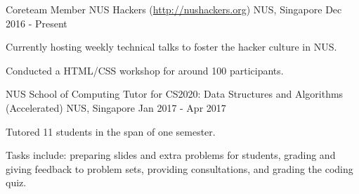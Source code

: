 

\begin{cventries}


  \cventry
  {Coreteam Member} %
  {NUS Hackers (\url{http://nushackers.org})} %
  {NUS, Singapore} %
  {Dec 2016 - Present} %
  { %
    \begin{cvitems}
    \item {Currently hosting weekly technical talks to foster the hacker culture in NUS.}
    \item {Conducted a HTML/CSS workshop for around 100 participants.}
    \end{cvitems}
  }


  \cventry
  {NUS School of Computing} %
  {Tutor for CS2020: Data Structures and Algorithms (Accelerated)} %
  {NUS, Singapore} %
  {Jan 2017 - Apr 2017} %
  { %
    \begin{cvitems}
    \item {Tutored 11 students in the span of one semester.}
    \item {Tasks include: preparing slides and extra problems for students, grading and giving feedback to problem sets, providing consultations, and grading the coding quiz.}
    \end{cvitems}
  }


\end{cventries}
